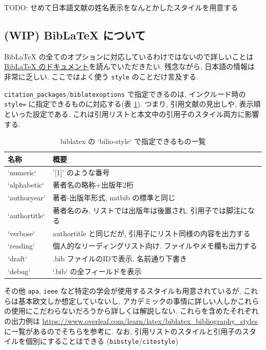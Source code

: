 \documentclass[
  xelatex,ja=standard,jafont=noto]{bxjsbook}
\theoremstyle{definition}
\theoremstyle{definition}
\theoremstyle{definition}
\theoremstyle{definition}
\theoremstyle{remark}
\begin{document}
TODO: せめて日本語文献の姓名表示をなんとかしたスタイルを用意する

\hypertarget{wip-biblatex-ux306bux3064ux3044ux3066}{%
\subsection{(WIP) BibLaTeX
について}\label{wip-biblatex-ux306bux3064ux3044ux3066}}

BibLaTeX の全てのオプションに対応しているわけではないので詳しいことは
\href{https://www.ctan.org/pkg/biblatex}{BibLaTeX
のドキュメント}を読んでいただきたい. 残念ながら,
日本語の情報は非常に乏しい. ここではよく使う \texttt{style}
のことだけ言及する.

\texttt{citation\_packages}/\texttt{biblatexoptions} で指定できるのは,
インクルード時の \texttt{style=} に指定できるものに対応する(表
\ref{tab:biblatex-styles}). つまり, 引用文献の見出しや,
表示順といった設定である.
これは引用リストと本文中の引用子のスタイル両方に影響する.

\begin{table}

\caption{\label{tab:biblatex-styles}biblatex の `bilio-style` で指定できるもの一覧}
\centering
\begin{tabular}[t]{ll}
\toprule
名称 & 概要\\
\midrule
`numeric` & '[1]' のような番号\\
`alphabetic` & 著者名の略称+出版年2桁\\
`authoryear` & 著者-出版年形式, natbib の標準と同じ\\
`authortitle` & 著者名のみ, リストでは出版年は後置され, 引用子では脚注になる\\
`verbose` & authortitle と同じだが, 引用子にリスト同様の内容を出力する\\
\addlinespace
`reading` & 個人的なリーディングリスト向け. ファイルやメモ欄も出力する\\
`draft` & .bib ファイルのIDで表示. 名前通り下書き\\
`debug` & `.bib` の全フィールドを表示\\
\bottomrule
\end{tabular}
\end{table}

その他 \texttt{apa}, \texttt{ieee}
など特定の学会が使用するスタイルも用意されているが,
これらは基本欧文しか想定していないし,
アカデミックの事情に詳しい人しかこれらの使用にこだわらないだろうから詳しくは解説しない.
これらを含めたそれぞれの出力例は
\url{https://www.overleaf.com/learn/latex/biblatex_bibliography_styles}
に一覧があるのでそちらを参考に. なお,
引用リストのスタイルと引用子のスタイルを個別にすることはできる
(\texttt{bibstyle}/\texttt{citestyle})
\end{document}
